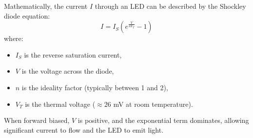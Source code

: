 Mathematically, the current \( I \) through an LED can be described by the Shockley diode equation:
\[ I = I_S \left( e^{\frac{V}{nV_T}} - 1 \right) \]
where:
\begin{itemize}
    \item \( I_S \) is the reverse saturation current,
    \item \( V \) is the voltage across the diode,
    \item \( n \) is the ideality factor (typically between 1 and 2),
    \item \( V_T \) is the thermal voltage (\( \approx 26 \) mV at room temperature).
\end{itemize}

When forward biased, \( V \) is positive, and the exponential term dominates, allowing significant current to flow and the LED to emit light.


